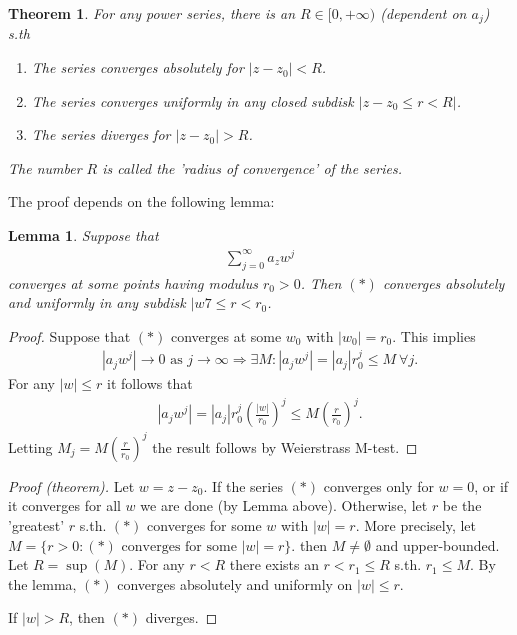 \documentclass[12pt, a4paper]{article}
\theoremstyle{plain}
\newtheorem{thm}{Theorem} %
\newtheorem{lemma}{Lemma}
\theoremstyle{definition}
\begin{document}
		\begin{thm}
			For any power series, there is an $R\in[0,+\infty)$ (dependent on $a_j$) s.th
			\begin{enumerate}[label=(\roman*)]
				\item The series converges absolutely for $|z-z_0|<R$.
				\item The series converges uniformly in any closed subdisk $|z-z_0\le r<R|$.
				\item The series diverges for $|z-z_0|>R$.
			\end{enumerate}
			The number $R$ is called the 'radius of convergence' of the series.
		\end{thm}

		The proof depends on the following lemma:\\

		\begin{lemma}
			Suppose that
			\begin{align*}
				\sum\limits_{j=0}^{\infty}a_zw^j\tag*{$(*)$}
			\end{align*}
			converges at some points having modulus $r_0>0$. Then $(*)$ converges absolutely and uniformly in any subdisk $|w7\le r < r_0$.
		\end{lemma}

		\begin{proof}
			Suppose that $(*)$ converges at some $w_0$ with $|w_0|=r_0$. This implies
			\begin{align*}
				|a_jw^j|\to 0\text{ as } j\to \infty \Rightarrow \exists M: |a_jw^j| = |a_j|r_0^j \le M\:\forall j.
			\end{align*}
			For any $|w|\le r$ it follows that
			\begin{align*}
				|a_jw^j| = |a_j|r_0^j\left(\frac{|w|}{r_0}\right)^j \le M\left(\frac{r}{r_0}\right)^j.
			\end{align*}
			Letting $M_j=M\left(\frac{r}{r_0}\right)^j$ the result follows by Weierstrass M-test.
		\end{proof}

		\begin{proof}[Proof (theorem)]
			Let $w=z-z_0$. If the series $(*)$ converges only for $w=0$, or if it converges for all $w$ we are done (by Lemma above). Otherwise, let $r$ be the 'greatest' $r$ s.th. $(*)$ converges for some $w$ with $|w|=r$. More precisely, let $M=\{r>0:(*)\text{ converges for some }|w|=r\}$. then $M\not=\emptyset$ and upper-bounded. Let $R = \sup(M)$. For any $r<R$ there exists an $r<r_1\le R$ s.th. $r_1\le M$. By the lemma, $(*)$ converges absolutely and uniformly on $|w|\le r$.

			If $|w|>R$, then $(*)$ diverges.
		\end{proof}
\end{document}
